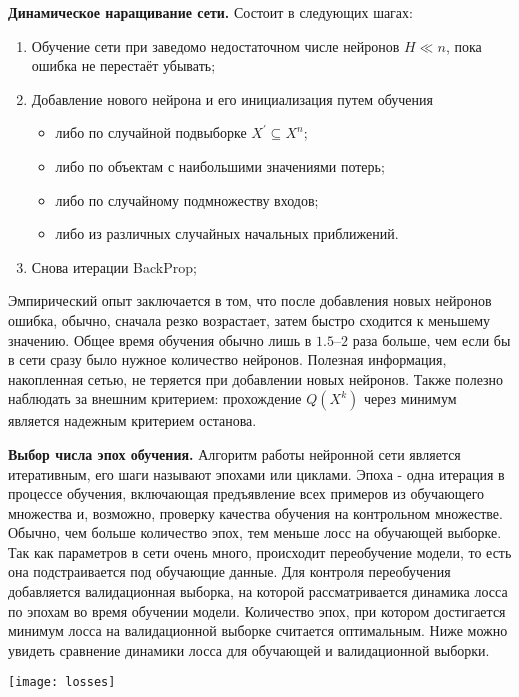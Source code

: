 \documentclass{article}
\begin{document}
	\textbf{Динамическое наращивание сети.} 
	Состоит в следующих шагах:
	\begin{enumerate}
		\item Обучение сети при заведомо недостаточном числе нейронов $H \ll n$, пока ошибка не перестаёт убывать;
		\item Добавление нового нейрона и его инициализация путем обучения 
		\begin{itemize}
			\item либо по случайной подвыборке $X^{'} \subseteq X^n$;
			\item либо по объектам с наибольшими значениями потерь;
			\item либо по случайному подмножеству входов;
			\item либо из различных случайных начальных приближений.
		\end{itemize}
		\item Снова итерации BackProp;
	\end{enumerate}
	
	Эмпирический опыт заключается в том, что после добавления новых нейронов ошибка, обычно, сначала резко возрастает, затем быстро сходится к меньшему значению. Общее время обучения обычно лишь в $1.5$--$2$ раза больше, чем если бы в сети сразу было нужное количество нейронов. Полезная информация, накопленная сетью, не теряется при добавлении новых нейронов. Также полезно наблюдать за внешним критерием: прохождение $Q(X^k)$ через минимум является надежным критерием останова.
	
	\textbf{Выбор числа эпох обучения.} Алгоритм работы нейронной сети является итеративным, его шаги называют эпохами или циклами. Эпоха - одна итерация в процессе обучения, включающая предъявление всех примеров из обучающего множества и, возможно, проверку качества обучения на контрольном множестве. Обычно, чем больше количество эпох, тем меньше лосс на обучающей выборке. Так как параметров в сети очень много, происходит переобучение модели, то есть она подстраивается под обучающие данные. Для контроля переобучения добавляется валидационная выборка, на которой рассматривается динамика лосса по эпохам во время обучении модели. Количество эпох, при котором достигается минимум лосса на валидационной выборке считается оптимальным. 
	Ниже можно увидеть сравнение динамики лосса для обучающей и валидационной выборки.
	
	\begin{center}
		\begin{minipage}{0.51\linewidth}
			\centering
			\texttt{[image: losses]}
		\end{minipage}
	\end{center}
\end{document}
